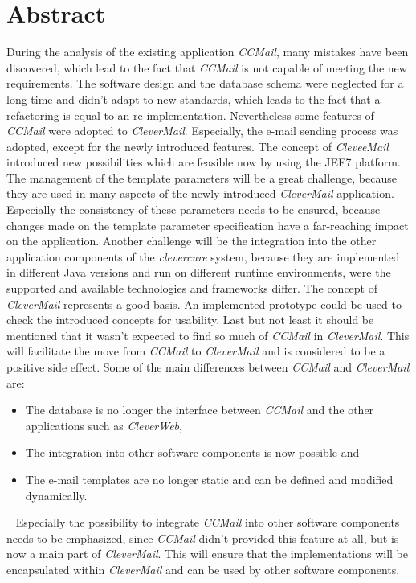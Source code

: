 \chapter{Abstract}
During the analysis of the existing application \emph{CCMail}, many mistakes have been discovered, which lead to the fact that \emph{CCMail} is not capable of meeting the new requirements. The software design and the database schema were neglected for a long time and didn't adapt to new standards, which leads to the fact that a refactoring is equal to an re-implementation. Nevertheless some features of \emph{CCMail} were adopted to \emph{CleverMail}. Especially, the e-mail sending process was adopted, except for the newly introduced features. The concept of \emph{CleveeMail} introduced new possibilities which are feasible now by using the JEE7 platform. The management of the template parameters will be a great challenge, because they are used in many aspects of the newly introduced \emph{CleverMail} application. Especially the consistency of these parameters needs to be ensured, because changes made on the template parameter specification have a far-reaching impact on the application.
\newline
\newline
Another challenge will be the integration into the other application components of the \emph{clevercure} system, because they are implemented in different Java versions and run on different runtime environments, were the supported and available technologies and frameworks differ. The concept of \emph{CleverMail} represents a good basis. An implemented prototype could be used to check the introduced concepts for usability. Last but not least it should be mentioned that it wasn't expected to find so much of \emph{CCMail} in \emph{CleverMail}. This will facilitate the move from \emph{CCMail} to \emph{CleverMail} and is considered to be a positive side effect. Some of the main differences between \emph{CCMail} and \emph{CleverMail} are:
\begin{itemize}
	\item The database is no longer the interface between \emph{CCMail} and the other applications such as \emph{CleverWeb},
	\item The integration into other software components is now possible and
	\item The e-mail templates are no longer static and can be defined and modified dynamically.
\end{itemize}
\ \newline
Especially the possibility to integrate \emph{CCMail} into other software components needs to be emphasized, since \emph{CCMail} didn't provided this feature at all, but is now a main part of \emph{CleverMail}. This will ensure that the implementations will be encapsulated within \emph{CleverMail} and can be used by other software components.